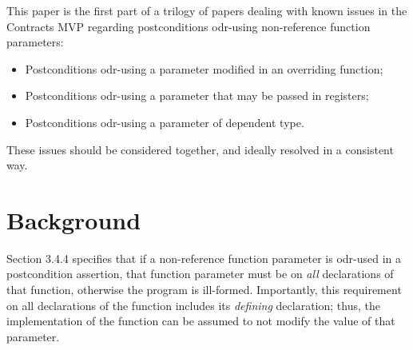 


This paper is the first part of a trilogy of papers dealing with known issues in the Contracts MVP \cite{P2900R10} regarding postconditions odr-using non-reference function parameters:
\begin{itemize}
\item \cite{D3484R2} Postconditions odr-using a parameter modified in an overriding function;
\item \cite{P3487R0} Postconditions odr-using a parameter that may be passed in registers;
\item \cite{P3489R0} Postconditions odr-using a parameter of dependent type.
\end{itemize}
These issues should be considered together, and ideally resolved in a consistent way.

\section{Background}
\label{bg}

\cite{P2900R10} Section 3.4.4 specifies that if a non-reference function parameter is odr-used in a postcondition assertion, that function parameter must be  on \emph{all} declarations of that function, otherwise the program is ill-formed.  Importantly, this requirement on all declarations of the function includes its \emph{defining} declaration; thus, the implementation of the function can be assumed to not modify the value of that parameter.

